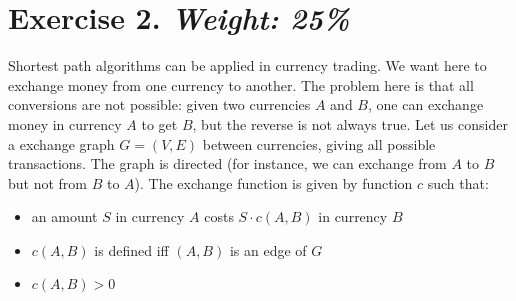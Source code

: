 \documentclass{article}
\begin{document}

\newpage
\section*{Exercise 2. \textit{Weight: 25\%}}
Shortest path algorithms can be applied in currency trading. We want here to exchange money from one currency to another. The problem here is that all conversions are not possible: given two currencies $A$ and $B$, one can exchange money in currency $A$ to get $B$, but the reverse is not always true. Let us consider a exchange graph $G = (V,E)$ between currencies, giving all possible transactions. The graph is directed (for instance, we can exchange from $A$ to $B$ but not from $B$ to $A$). The exchange function is given by function $c$ such that:
\begin{itemize}
	\item an amount $S$ in currency $A$ costs $S \cdot c(A,B)$ in currency $B$
	\item $c(A,B)$ is defined iff $(A,B)$ is an edge of $G$
	\item $c(A,B) > 0$
\end{itemize}
\end{document}
